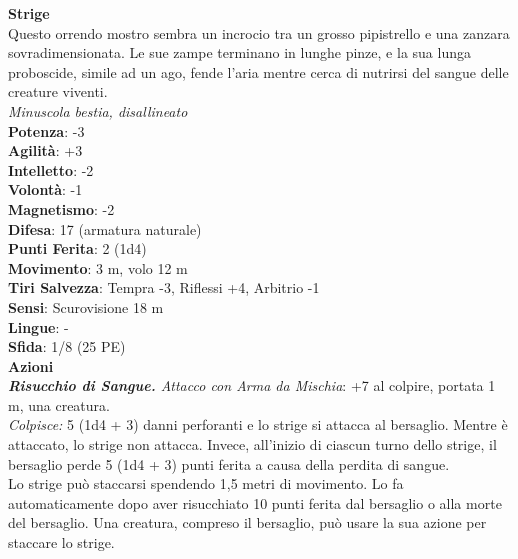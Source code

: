 \begin{multicols}{2}
\medskip\textbf{Strige}\\
Questo orrendo mostro sembra un incrocio tra un grosso pipistrello e una zanzara sovradimensionata. Le sue zampe terminano in lunghe pinze, e la sua lunga proboscide, simile ad un ago, fende l'aria mentre cerca di nutrirsi del sangue delle creature viventi.\\
\emph{Minuscola bestia, disallineato}\\
\textbf{Potenza}: -3\\
\textbf{Agilità}: +3\\
\textbf{Intelletto}: -2\\
\textbf{Volontà}: -1\\
\textbf{Magnetismo}: -2\\
\textbf{Difesa}: 17 (armatura naturale)\\
\textbf{Punti Ferita}: 2 (1d4)\\
\textbf{Movimento}: 3 m, volo 12 m\\
\textbf{Tiri Salvezza}: Tempra -3, Riflessi +4, Arbitrio -1\\
\textbf{Sensi}: Scurovisione 18 m\\
\textbf{Lingue}: -\\
\textbf{Sfida}: 1/8 (25 PE)\smallskip\\
\smallskip\textbf{Azioni}\\
\emph{\textbf{Risucchio di Sangue.} Attacco con Arma da Mischia}: +7 al colpire, portata 1 m, una creatura.\\
\emph{Colpisce:} 5 (1d4 + 3) danni perforanti e lo strige si attacca al bersaglio. Mentre è attaccato, lo strige non attacca. Invece, all'inizio di ciascun turno dello strige, il bersaglio perde 5 (1d4 + 3) punti ferita a causa della perdita di sangue.\\
Lo strige può staccarsi spendendo 1,5 metri di movimento. Lo fa automaticamente dopo aver risucchiato 10 punti ferita dal bersaglio o alla morte del bersaglio. Una creatura, compreso il bersaglio, può usare la sua azione per staccare lo strige.\\


\end{multicols}
